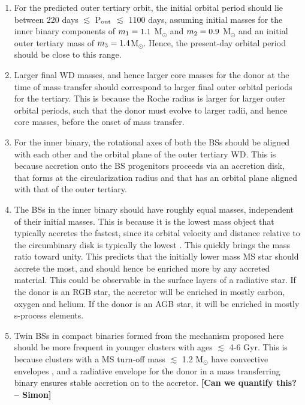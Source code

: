 \documentclass{aastex62}
\def\simon#1{{\bf {\color{red}[#1 -- Simon]}}}
\begin{document}
\begin{enumerate}

\item For the predicted outer tertiary orbit, the initial 
  orbital period should lie between 220 days $\lesssim$ P$_{\rm out}$
  $\lesssim$ 1100 days, assuming initial masses for the inner binary
  components of $m_{\rm 1} = 1.1$ M$_{\odot}$ and $m_{\rm 2} = 0.9$
  M$_{\odot}$ and an initial outer tertiary mass of $m_{\rm 3} = 1.4
  $M$_{\odot}$.  Hence, the present-day orbital period should be close to this range.

\item Larger final WD masses, and hence larger core masses for the donor at
  the time of mass transfer should correspond to larger final outer
  orbital periods for the tertiary.  This is because the Roche radius
  is larger for larger outer orbital periods, such that the donor must
  evolve to larger radii, and hence core masses, before the onset of
  mass transfer.

\item For the inner binary, the rotational axes of both the BSs should
  be aligned with each other and the orbital plane of the outer
  tertiary WD.  This is because accretion onto the BS progenitors
  proceeds via an accretion disk, that forms at the circularization
  radius and that has an orbital plane aligned with that of the outer
  tertiary.

\item The BSs in the inner binary should have roughly equal masses,
  independent of their initial masses.  This is because it is the
  lowest mass object that typically accretes the fastest, since its
  orbital velocity and distance relative to the circumbinary disk is
  typically the lowest
  \citep[e.g.][]{1995MNRAS.277.1491K,1997MNRAS.285...33B,2000MNRAS.314...33B}.
  This quickly brings the mass ratio toward unity.  This predicts that
  the initially lower mass MS star should accrete the most, and should
  hence be enriched more by any accreted material.  This could be
  observable in the surface layers of a radiative star.  If the donor
  is an RGB star, the accretor will be enriched in mostly carbon,
  oxygen and helium.  If the donor is an AGB star, it will be enriched
  in mostly s-process elements.

\item Twin BSs in compact binaries formed from the mechanism proposed here 
  should be more frequent in younger clusters with ages $\lesssim$ 4-6
  Gyr.  This is because clusters with a MS turn-off mass
  $\lesssim$ 1.2 M$_{\odot}$ have convective envelopes
  \citep[e.g.][]{1991ApJS...76...55I,2009pfer.book.....M}, and a radiative envelope for the
  donor in a mass transferring binary ensures stable accretion on to
  the accretor.  \simon{Can we quantify this?}

\end{enumerate}
\end{document}
